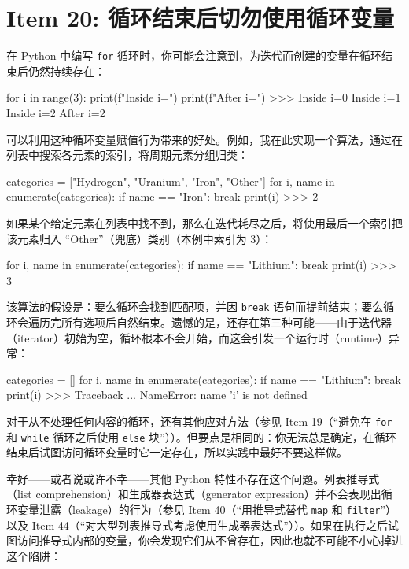 \section{Item 20: 循环结束后切勿使用循环变量}

在 Python 中编写 \texttt{for} 循环时，你可能会注意到，为迭代而创建的变量在循环结束后仍然持续存在：

\begin{codebox}[python]
for i in range(3):
    print(f"Inside {i=}")
print(f"After  {i=}")
>>>
Inside i=0
Inside i=1
Inside i=2
After  i=2
\end{codebox}

可以利用这种循环变量赋值行为带来的好处。例如，我在此实现一个算法，通过在列表中搜索各元素的索引，将周期元素分组归类：

\begin{codebox}[python]
categories = ["Hydrogen", "Uranium", "Iron", "Other"]
for i, name in enumerate(categories):
    if name == "Iron":
        break
print(i)
>>>
2
\end{codebox}

如果某个给定元素在列表中找不到，那么在迭代耗尽之后，将使用最后一个索引把该元素归入 ``Other''（兜底）类别（本例中索引为 3）：

\begin{codebox}[python]
for i, name in enumerate(categories):
    if name == "Lithium":
        break
print(i)
>>>
3
\end{codebox}

该算法的假设是：要么循环会找到匹配项，并因 \texttt{break} 语句而提前结束；要么循环会遍历完所有选项后自然结束。遗憾的是，还存在第三种可能——由于迭代器（iterator）初始为空，循环根本不会开始，而这会引发一个运行时（runtime）异常：

\begin{codebox}[python]
categories = []
for i, name in enumerate(categories):
    if name == "Lithium":
        break
print(i)
>>>
Traceback ...
NameError: name 'i' is not defined
\end{codebox}

对于从不处理任何内容的循环，还有其他应对方法（参见 Item 19（``避免在 \texttt{for} 和 \texttt{while} 循环之后使用 \texttt{else} 块''））。但要点是相同的：你无法总是确定，在循环结束后试图访问循环变量时它一定存在，所以实践中最好不要这样做。

幸好——或者说或许不幸——其他 Python 特性不存在这个问题。列表推导式（list comprehension）和生成器表达式（generator expression）并不会表现出循环变量泄露（leakage）的行为（参见 Item 40（``用推导式替代 \texttt{map} 和 \texttt{filter}''）以及 Item 44（``对大型列表推导式考虑使用生成器表达式''））。如果在执行之后试图访问推导式内部的变量，你会发现它们从不曾存在，因此也就不可能不小心掉进这个陷阱：

